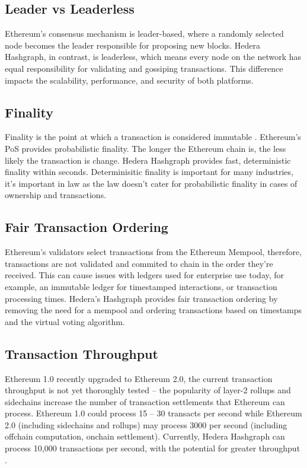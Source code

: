 \documentclass[
	a4paper, %
	10pt, %
	unnumberedsections, %
	twoside, %
]{LTJournalArticle}
\begin{document}
\subsection{Leader vs Leaderless}
Ethereum's consensus mechanism is leader-based, where a randomly selected node becomes the leader responsible for proposing new blocks. Hedera Hashgraph, in contrast, is leaderless, which means every node on the network has equal responsibility for validating and gossiping transactions. This difference impacts the scalability, performance, and security of both platforms.

\subsection{Finality}
Finality is the point at which a transaction is considered immutable \cite{pan_plume_2021}. Ethereum’s PoS provides probabilistic finality. The longer the Ethereum chain is, the less likely the transaction is change. Hedera Hashgraph provides fast, deterministic finality within seconds. Determinisitic finality is important for many industries, it’s important in law as the law doesn’t cater for probabilistic finality in cases of ownership and transactions.

\subsection{Fair Transaction Ordering}
Ethereum’s validators select transactions from the Ethereum Mempool, therefore, transactions are not validated and commited to chain in the order they’re received. This can cause issues with ledgers used for enterprise use today, for example, an immutable ledger for timestamped interactions, or transaction processing times. Hedera’s Hashgraph provides fair transaction ordering \cite{gross_co-founder_nodate}by removing the need for a mempool and ordering transactions based on timestamps and the virtual voting algorithm.

\subsection{Transaction Throughput}
Ethereum 1.0 recently upgraded to Ethereum 2.0, the current transaction throughput is not yet thoroughly tested – the popularity of layer-2 rollups and sidechains increase the number of transaction settlements that Ethereum can process. Ethereum 1.0 could process 15 – 30 transacts per second while Ethereum 2.0 (including sidechains and rollups) may process 3000 per second (including offchain computation, onchain settlement). Currently, Hedera Hashgraph can process 10,000 transactions per second, with the potential for greater throughput \cite{james_experimental_2019}. 
\end{document}

